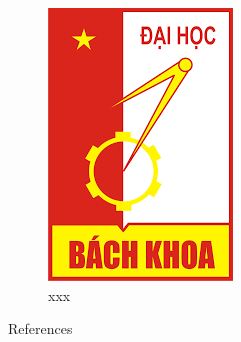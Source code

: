 \newpage

\lipsum[1]

\begin{figure}[H]
\centering
\includegraphics[scale = 0.4]{pictures/HUST.png}
\caption{xxx}
\end{figure}


References \cite{syropoulos2007digital}